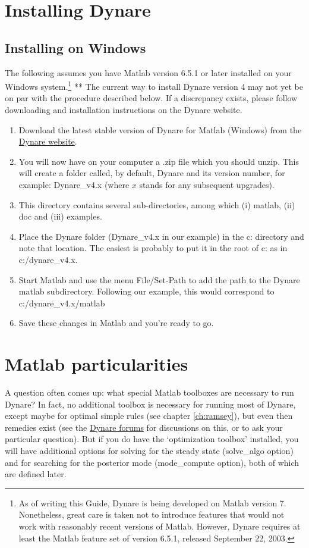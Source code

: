 \section{Installing Dynare}
\subsection{Installing on Windows}
The following assumes you have Matlab version 6.5.1 or later installed on your Windows system.\footnote{As of writing this Guide, Dynare is being developed on Matlab version 7. Nonetheless, great care is taken not to introduce features that would not work with reasonably recent versions of Matlab. However, Dynare requires at least the Matlab feature set of version 6.5.1, released September 22, 2003.} ** The current way to install Dynare version 4 may not yet be on par with the procedure described below. If a discrepancy exists, please follow downloading and installation instructions on the Dynare website. \begin{enumerate}
\item Download the latest stable version of Dynare for Matlab (Windows) from the \href{http://www.cepremap.cnrs.fr/juillard/mambo/index.php?option=com_frontpage&Itemid=1}{Dynare website}. 
\item You will now have on your computer a .zip file which you should unzip. This will create a folder called, by default, Dynare and its version number, for example: Dynare\_v4.x (where $x$ stands for any subsequent upgrades). 
\item This directory contains several sub-directories, among which (i) matlab, (ii) doc and (iii) examples. 
\item Place the Dynare folder (Dynare\_v4.x in our example) in the c: directory and note that location. The easiest is probably to put it in the root of c: as in c:/dynare\_v4.x.
\item Start Matlab and use the menu File/Set-Path to add the path to the Dynare 
matlab subdirectory. Following our example, this would correspond to 
c:/dynare\_v4.x/matlab
\item Save these changes in Matlab and you're ready to go.
\end{enumerate} 


\section{Matlab particularities}

A question often comes up: what special Matlab toolboxes are necessary to run Dynare? In fact, no additional toolbox is necessary for running most of Dynare, except maybe for optimal simple rules (see chapter \ref{ch:ramsey}), but even then remedies exist (see the \href{http://www.cepremap.cnrs.fr/juillard/mambo/index.php?option=com_forum&Itemid=95}{Dynare forums} for discussions on this, or to ask your particular question). But if you do have the `optimization toolbox' installed, you will have additional options for solving for the steady state (solve\_algo option) and for searching for the posterior mode (mode\_compute option), both of which are defined later. 


